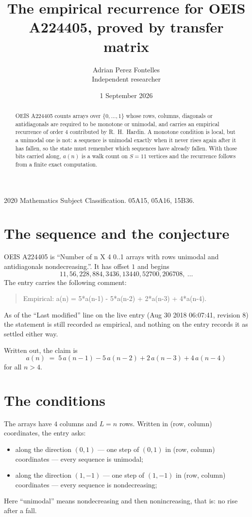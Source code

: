 \documentclass[11pt,a4paper]{article}
\title{The empirical recurrence for OEIS A224405, proved by transfer matrix}
\author{Adrian Perez Fontelles\\ \small Independent researcher}
\date{1 September 2026}
\theoremstyle{plain}
\theoremstyle{definition}
\begin{document}
\maketitle

\begin{abstract}
OEIS A224405 counts arrays over $\{0,\dots,1\}$ whose rows, columns, diagonals or
antidiagonals are required to be monotone or unimodal, and carries an empirical recurrence of
order $4$ contributed by R.~H.~Hardin. A monotone condition is local, but a unimodal one
is not: a sequence is unimodal exactly when it never rises again after it has fallen, so the
state must remember which sequences have already fallen. With those bits carried along, $a(n)$
is a walk count on $S=11$ vertices and the recurrence follows from a finite exact
computation.
\end{abstract}

\noindent\small 2020 Mathematics Subject Classification. 05A15, 05A16, 15B36.\normalsize

\section{The sequence and the conjecture}

OEIS A224405 is ``Number of n X 4 0..1 arrays with rows unimodal and antidiagonals nondecreasing.''. It has offset $1$ and begins
\[
11, 56, 228, 884, 3436, 13440, 52700, 206708,\ \dots
\]
The entry carries the following comment:
\begin{quote}\small
Empirical: a(n) = 5*a(n-1) - 5*a(n-2) + 2*a(n-3) + 4*a(n-4).
\end{quote}
As of the ``Last modified'' line on the live entry (Aug 30 2018 06:07:41, revision 8) the statement is
still recorded as empirical, and nothing on the entry records it as settled either way.

Written out, the claim is
\begin{equation}\label{eq:conj}
a(n)\;=\;5\,a(n-1) - 5\,a(n-2) + 2\,a(n-3) + 4\,a(n-4)
\end{equation}
for all $n>4$.

\section{The conditions}

The arrays have $4$ columns and $L=n$ rows. Written in (row, column)
coordinates, the entry asks:
\begin{itemize}
\item along the direction $(0,1)$ --- one step of $(0,1)$ in (row, column) coordinates --- every sequence is unimodal;
\item along the direction $(1,-1)$ --- one step of $(1,-1)$ in (row, column) coordinates --- every sequence is nondecreasing;
\end{itemize}
Here ``unimodal'' means nondecreasing and then nonincreasing, that is: no rise after a fall.
\end{document}
